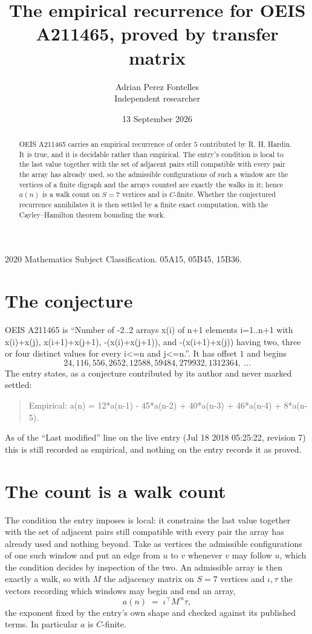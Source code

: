 \documentclass[11pt,a4paper]{article}
\title{The empirical recurrence for OEIS A211465, proved by transfer matrix}
\author{Adrian Perez Fontelles\\ \small Independent researcher}
\date{13 September 2026}
\theoremstyle{plain}
\theoremstyle{definition}
\begin{document}
\maketitle

\begin{abstract}
OEIS A211465 carries an empirical recurrence of order $5$ contributed by R. H. Hardin. It is
true, and it is decidable rather than empirical. The entry's condition is local to the last value together with the set of adjacent pairs still compatible with every pair the array has already used, so
the admissible configurations of such a window are the vertices of a finite digraph and the
arrays counted are exactly the walks in it; hence $a(n)$ is a walk count on $S=7$ vertices
and is $C$-finite. Whether the conjectured recurrence annihilates it is then settled by a
finite exact computation, with the Cayley--Hamilton theorem bounding the work.
\end{abstract}

\noindent\small 2020 Mathematics Subject Classification. 05A15, 05B45, 15B36.\normalsize

\section{The conjecture}

OEIS A211465 is ``Number of -2..2 arrays x(i) of n+1 elements i=1..n+1 with x(i)+x(j), x(i+1)+x(j+1), -(x(i)+x(j+1)), and -(x(i+1)+x(j)) having two, three or four distinct values for every i<=n and j<=n.''. It has offset $1$ and begins
\[
24, 116, 556, 2652, 12588, 59484, 279932, 1312364,\ \dots
\]
The entry states, as a conjecture contributed by its author and never marked settled:
\begin{quote}
Empirical: a(n) = 12*a(n-1) - 45*a(n-2) + 40*a(n-3) + 46*a(n-4) + 8*a(n-5).
\end{quote}
As of the ``Last modified'' line on the live entry (Jul 18 2018 05:25:22, revision 7) this is still
recorded as empirical, and nothing on the entry records it as proved.

\section{The count is a walk count}

The condition the entry imposes is local: it constrains the last value together with the set of adjacent pairs still compatible with every pair the array has already used and nothing beyond. Take as
vertices the admissible configurations of one such window and put an edge from $u$ to $v$
whenever $v$ may follow $u$, which the condition decides by inspection of the two. An
admissible array is then exactly a walk, so with $M$ the adjacency matrix on $S=7$ vertices
and $\iota,\tau$ the vectors recording which windows may begin and end an array,
\[
a(n)\;=\;\iota^{\!\top}M^{\,n}\tau ,
\]
the exponent fixed by the entry's own shape and checked against its published terms. In
particular $a$ is $C$-finite.
\end{document}
